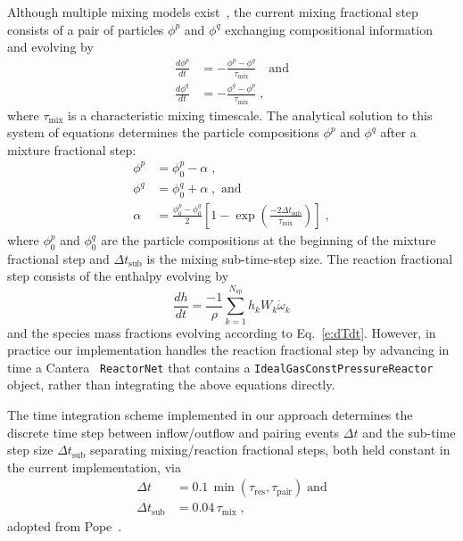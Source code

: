\documentclass[preprint,12pt]{elsarticle}
\newcommand{ \numsp }{N_{\text{sp}}}
\begin{document}
{Although multiple mixing models exist~\cite{Ren:2004fz}, the current mixing fractional step consists of a pair of particles $\phi^p$ and $\phi^q$ exchanging compositional information and evolving by
\begin{align}
\frac{d \phi^p}{dt} &= - \frac{ \phi^p - \phi^q }{ \tau_{\text{mix}} } \quad \text{and} \\
\frac{d \phi^q}{dt} &= - \frac{ \phi^q - \phi^p }{ \tau_{\text{mix}} } \;,
\end{align}
where $\tau_{\text{mix}}$ is a characteristic mixing timescale.
The analytical solution to this system of equations determines the particle compositions $\phi^p$ and $\phi^q$ after a mixture fractional step:
\begin{align}
\phi^p &= \phi^p_0 - \alpha \;, \\
\phi^q &= \phi^q_0 + \alpha \;, \text{ and} \\
\alpha &= \frac{ \phi^p_0 - \phi^q_0 }{2} \left[1 - \exp \left( \frac{-2 \Delta t_{\text{sub}}}{\tau_{\text{mix}}} \right) \right] \;,
\end{align}
where $\phi^p_0$ and $\phi^q_0$ are the particle compositions at the beginning of the mixture fractional step and $\Delta t_{\text{sub}}$ is the mixing sub-time-step size.
The reaction fractional step consists of the enthalpy evolving by
\begin{equation}
\frac{dh}{dt} = \frac{-1}{\rho} \sum_{k=1}^{\numsp} h_k W_k \dot{\omega}_k
\end{equation}
and the species mass fractions evolving according to Eq.~\eqref{e:dTdt}.
However, in practice our implementation handles the reaction fractional step by advancing in time a Cantera~\cite{Goodwin:2015aa} \texttt{ReactorNet} that contains a \texttt{IdealGasConstPressureReactor} object, rather than integrating the above equations directly.

The time integration scheme implemented in our approach determines the discrete time step between inflow\slash outflow and pairing events $\Delta t$ and the sub-time step size $\Delta t_{\text{sub}}$ separating mixing\slash reaction fractional steps, both held constant in the current implementation, via
\begin{align}
\Delta t &= 0.1 \, \min \left( \tau_{\text{res}} , \tau_{\text{pair}} \right) \; \text{and} \\
\Delta t_{\text{sub}} &= 0.04 \, \tau_{\text{mix}} \;,
\end{align}
adopted from Pope~\cite{Pope:1997wu}.

}
\end{document}
